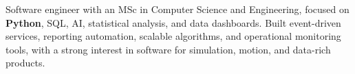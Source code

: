 \begin{cvparagraph}
  Software engineer with an MSc in Computer Science and Engineering, focused on \textbf{Python}, SQL, AI, statistical analysis, and data dashboards. Built event-driven services, reporting automation, scalable algorithms, and operational monitoring tools, with a strong interest in software for simulation, motion, and data-rich products.
\end{cvparagraph}
